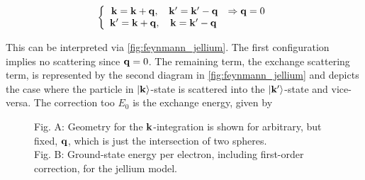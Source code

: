 \documentclass{homework}
\begin{document}
\begin{equation}
    \left\{\begin{array}{ccc}
        {\bf k} = {\bf k} + {\bf q,} & {\bf k}' = {\bf k}' - {\bf q} & \Rightarrow {\bf q} = 0 \\
        {\bf k}' = {\bf k} + {\bf q}, & {\bf k} = {\bf k}' - {\bf q}
    \end{array} \right.
\end{equation}

This can be interpreted via \cref{fig:feynmann_jellium}. The first configuration implies no scattering since ${\bf q} = 0$. The remaining term, the exchange scattering term, is represented by the second diagram in \cref{fig:feynmann_jellium} and depicts the case where the particle in $\ket{{\bf k}}$-state is scattered into the $\ket{{\bf k}'}$-state and vice-versa. The correction too $E_0$ is the exchange energy, given by 

\begin{figure}
    \centering
    \qquad
    \caption{Fig. A: Geometry for the ${\bf k}$-integration is shown for arbitrary, but fixed, ${\bf q}$, which is just the intersection of two spheres. \\
    Fig. B: Ground-state energy per electron, including first-order correction, for the jellium model.}
    \label{figs:jellium}
\end{figure}
\end{document}
